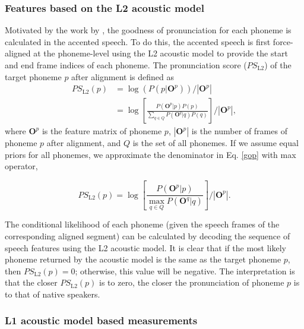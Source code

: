 \subsubsection{Features based on the L2 acoustic model}
\label{sec:L2_measure}

Motivated by the work by \cite{witt2000phone}, the goodness of pronunciation for each phoneme is calculated in the accented speech. To do this, the accented speech is first force-aligned at the phoneme-level using the L2 acoustic model to provide the start and end frame indices of each phoneme. The pronunciation score ($PS_{\mathrm{L2}}$) of the target phoneme $p$ after alignment is defined as
\begin{equation}
\label{gop}
\begin{aligned}
PS_{\mathrm{L2}}(p) &= \log(P(p|\mathbf{O}^{p}))/\left | \mathbf{O}^{p} \right | \\
      &= \log \left [ \frac{P(\mathbf{O}^{p}|p)P(p)}{\sum_{q\in \mathit{Q}} P(\mathbf{O}^{q}|q)P(q)} \right ] /\left | \mathbf{O}^{p} \right |,
\end{aligned}
\end{equation}
where $\mathbf{O}^{p}$ is the feature matrix of phoneme $p$, $\left |\mathbf{O}^{p}\right |$ is the number of frames of phoneme $p$ after alignment, and $\mathit{Q}$ is the set of all phonemes. If we assume equal priors for all phonemes, we approximate the denominator in Eq. \ref{gop} with max operator,

\begin{equation}
\label{gop2}
PS_{\mathrm{L2}}(p) = \log \left [ \frac{P(\mathbf{O}^{p}|p)}{\max_{q\in \mathit{Q}} P(\mathbf{O}^{q}|q)} \right ] /\left | \mathbf{O}^{p} \right |.
\end{equation}

The conditional likelihood of each phoneme (given the speech frames of the corresponding aligned segment) can be calculated by decoding the sequence of speech features using the L2 acoustic model. It is clear that if the most likely phoneme returned by the acoustic model is the same as the target phoneme $p$, then $PS_{\mathrm{L2}}(p)=0$; otherwise, this value will be negative. The interpretation is that the closer $PS_{\mathrm{L2}}(p)$ is to zero, the closer the pronunciation of phoneme $p$ is to that of native speakers.

\subsubsection{L1 acoustic model based measurements}
\label{sec:L1_measure}

